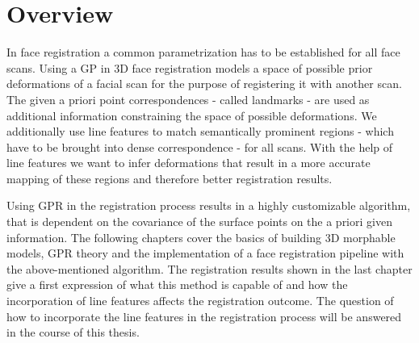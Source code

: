 \section{Overview}
In face registration a common parametrization has to be established for all face scans. Using a GP in 3D face registration models a space of possible prior
deformations of a facial scan for the purpose of registering it with another scan. The given a priori point correspondences - called landmarks - are used as additional information constraining the space of possible deformations. We additionally use line features to match semantically prominent regions - which have to be brought into dense correspondence - for all scans. With the help of line features we want to infer
deformations that result in a more accurate mapping of these regions and therefore better
registration results. \begin{comment}As GPR is an inference technique we can further directly derive the optimization.\end{comment}
Using GPR in the registration process results in a highly customizable algorithm, that is  dependent on the covariance of the surface points on the a priori given information. 
The following chapters cover the basics of building 3D morphable models, GPR theory and the implementation of a face registration
pipeline with the above-mentioned algorithm. The registration results shown in the last chapter give a first expression of what this method is capable of and how the incorporation of line features affects the registration outcome. 
The question of how to incorporate the line features in the registration process will be answered in the course of this thesis.

\begin{comment}
One of the major questions beforehand was how to incorporate 
One of the major problems was how to use line features in a way that they could be used by the algorithm to further constrain the space of admissible deformations.
How to incorporate information of the 2D line features into the Gaussian Process?

start with idea of how thesis will be structured. What will be covered in each subsequent chapter?
start broad, explain purpose of thesis
talk about specific things related to your niche
something unexpected
why does work matter? to help justify own work
best work in the field, what gaps of knowledge remain? Brian ambergs registration method is not set in general theory, GPR is
conclusion, but set up sense of anticipation
summarise general principles, state problem or question that needs an answer and give quick hint how following chapters will help to answer question

Registration is the method of making data from different measurements or even sources comparable by applying a transformation. It has many applications, for example in computer vision and medically imaging.
\end{comment}
